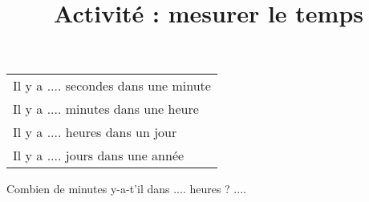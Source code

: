 \documentclass[a4paper,11pt]{article}
\title{Activité : mesurer le temps}
\date{}
\author{}
\begin{document}
\begin{tabular}{l}
	Il y a .... secondes dans une minute \\
	Il y a .... minutes dans une heure   \\
	Il y a .... heures dans un jour      \\
	Il y a .... jours dans une année     \\
\end{tabular} \vspace{1em}

Combien de minutes y-a-t'il dans .... heures ? ....
\end{document}
